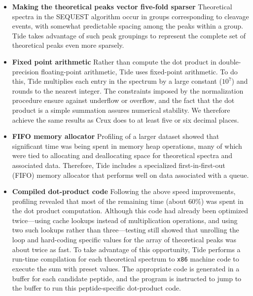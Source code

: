 \begin{itemize}
\item {\bf Making the theoretical peaks vector five-fold sparser}
  Theoretical spectra in the SEQUEST algorithm occur in groups
  corresponding to cleavage events, with somewhat predictable spacing
  among the peaks within a group. Tide takes advantage of such peak
  groupings to represent the complete set of theoretical peaks even
  more sparsely. \DIFaddbegin {}\DIFaddend 

\item {\bf Fixed point arithmetic} Rather than compute the dot product
  in double-precision floating-point arithmetic, Tide uses fixed-point
  arithmetic. To do this, Tide multiplies each entry in the spectrum
  by a large constant ($10^7$) and rounds to the nearest integer. The
  constraints imposed by the normalization procedure ensure against
  underflow or overflow, and the fact that the dot product is a simple
  summation assures numerical stability. We therefore achieve the same
  results as Crux does to at least five or six decimal places.

\item {\bf FIFO memory allocator} Profiling of a larger dataset showed
  that significant time was being spent in memory heap operations,
  many of which were tied to allocating and deallocating space for
  theoretical spectra and associated data. Therefore, Tide includes a
  specialized first-in-first-out (FIFO) memory allocator that performs
  well on data associated with a queue.

\item {\bf Compiled dot-product code} Following the above speed
  improvements, profiling revealed that most of the remaining time
  (about $60\%$) was spent in the dot product computation.  Although
  this code had already been optimized twice---using cache lookups
  instead of multiplication operations, and using two such lookups
  rather than three---testing still showed that unrolling the loop
  and hard-coding specific values for the array of theoretical peaks
  was about twice as fast.  To take advantage of this opportunity,
  Tide performs a run-time compilation for each theoretical spectrum
  to {\tt x86} machine code to execute the sum with preset values. The
  appropriate code is generated in a buffer for each candidate
  peptide, and the program is instructed to jump to the buffer to run
  this peptide-specific dot-product code.

\end{itemize}

